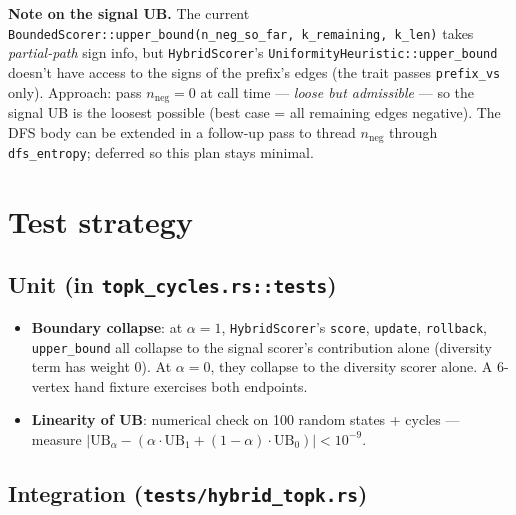 \documentclass[a4paper,11pt]{article}
\begin{document}
\textbf{Note on the signal UB.}  The current
\texttt{BoundedScorer::upper\_bound(n\_neg\_so\_far, k\_remaining, k\_len)}
takes \emph{partial-path} sign info, but \texttt{HybridScorer}'s
\texttt{UniformityHeuristic::upper\_bound} doesn't have access to
the signs of the prefix's edges (the trait passes \texttt{prefix\_vs}
only).  Approach: pass $n_{\mathrm{neg}} = 0$ at call time —
\emph{loose but admissible} — so the signal UB is the loosest
possible (best case = all remaining edges negative).  The DFS body
can be extended in a follow-up pass to thread $n_{\mathrm{neg}}$
through \texttt{dfs\_entropy}; deferred so this plan stays minimal.

\section*{Test strategy}

\subsection*{Unit (in \texttt{topk\_cycles.rs::tests})}

\begin{itemize}
  \item \textbf{Boundary collapse}: at $\alpha = 1$, \texttt{HybridScorer}'s
    \texttt{score}, \texttt{update}, \texttt{rollback},
    \texttt{upper\_bound} all collapse to the signal scorer's
    contribution alone (diversity term has weight 0).  At $\alpha = 0$,
    they collapse to the diversity scorer alone.  A 6-vertex hand
    fixture exercises both endpoints.
  \item \textbf{Linearity of UB}: numerical check on 100 random
    states + cycles — measure
    $|\mathrm{UB}_\alpha - (\alpha \cdot \mathrm{UB}_1 + (1 - \alpha)
    \cdot \mathrm{UB}_0)| < 10^{-9}$.
\end{itemize}

\subsection*{Integration (\texttt{tests/hybrid\_topk.rs})}
\end{document}
